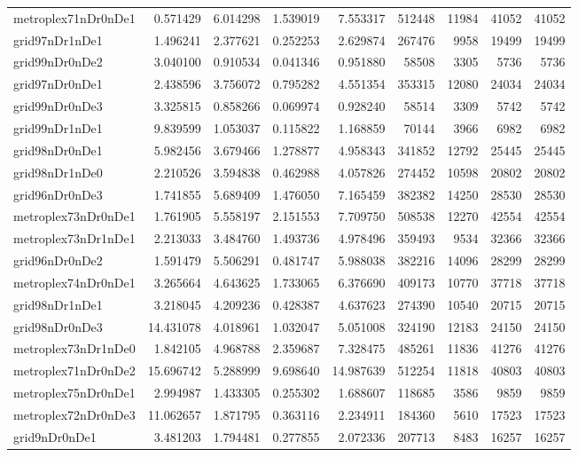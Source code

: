 \begin{longtable}{|l|r|r|r|r|r|r|r|r|}
metroplex71nDr0nDe1 & 0.571429 & 6.014298 & 1.539019 & 7.553317 & 512448 & 11984 & 41052 & 41052 \\
grid97nDr1nDe1 & 1.496241 & 2.377621 & 0.252253 & 2.629874 & 267476 & 9958 & 19499 & 19499 \\
grid99nDr0nDe2 & 3.040100 & 0.910534 & 0.041346 & 0.951880 & 58508 & 3305 & 5736 & 5736 \\
grid97nDr0nDe1 & 2.438596 & 3.756072 & 0.795282 & 4.551354 & 353315 & 12080 & 24034 & 24034 \\
grid99nDr0nDe3 & 3.325815 & 0.858266 & 0.069974 & 0.928240 & 58514 & 3309 & 5742 & 5742 \\
grid99nDr1nDe1 & 9.839599 & 1.053037 & 0.115822 & 1.168859 & 70144 & 3966 & 6982 & 6982 \\
grid98nDr0nDe1 & 5.982456 & 3.679466 & 1.278877 & 4.958343 & 341852 & 12792 & 25445 & 25445 \\
grid98nDr1nDe0 & 2.210526 & 3.594838 & 0.462988 & 4.057826 & 274452 & 10598 & 20802 & 20802 \\
grid96nDr0nDe3 & 1.741855 & 5.689409 & 1.476050 & 7.165459 & 382382 & 14250 & 28530 & 28530 \\
metroplex73nDr0nDe1 & 1.761905 & 5.558197 & 2.151553 & 7.709750 & 508538 & 12270 & 42554 & 42554 \\
metroplex73nDr1nDe1 & 2.213033 & 3.484760 & 1.493736 & 4.978496 & 359493 & 9534 & 32366 & 32366 \\
grid96nDr0nDe2 & 1.591479 & 5.506291 & 0.481747 & 5.988038 & 382216 & 14096 & 28299 & 28299 \\
metroplex74nDr0nDe1 & 3.265664 & 4.643625 & 1.733065 & 6.376690 & 409173 & 10770 & 37718 & 37718 \\
grid98nDr1nDe1 & 3.218045 & 4.209236 & 0.428387 & 4.637623 & 274390 & 10540 & 20715 & 20715 \\
grid98nDr0nDe3 & 14.431078 & 4.018961 & 1.032047 & 5.051008 & 324190 & 12183 & 24150 & 24150 \\
metroplex73nDr1nDe0 & 1.842105 & 4.968788 & 2.359687 & 7.328475 & 485261 & 11836 & 41276 & 41276 \\
metroplex71nDr0nDe2 & 15.696742 & 5.288999 & 9.698640 & 14.987639 & 512254 & 11818 & 40803 & 40803 \\
metroplex75nDr0nDe1 & 2.994987 & 1.433305 & 0.255302 & 1.688607 & 118685 & 3586 & 9859 & 9859 \\
metroplex72nDr0nDe3 & 11.062657 & 1.871795 & 0.363116 & 2.234911 & 184360 & 5610 & 17523 & 17523 \\
grid9nDr0nDe1 & 3.481203 & 1.794481 & 0.277855 & 2.072336 & 207713 & 8483 & 16257 & 16257 \\

\end{longtable}
